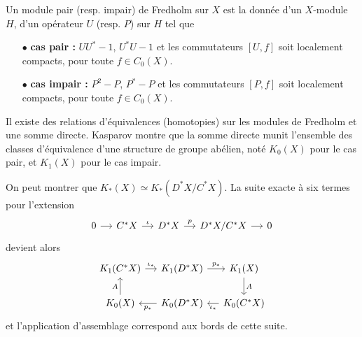 \documentclass{beamer}
\begin{document}
\begin{frame}
\begin{definition}
Un module pair (resp. impair) de Fredholm sur $X$ est la donnée d'un $X$-module $H$, d'un opérateur $U$ (resp. $P$) sur $H$ tel que
\begin{itemize}
\item[$\bullet$] \textbf{cas pair :} $UU^*-1$, $U^*U-1$ et les commutateurs $[U,f]$ soit localement compacts, pour toute $f\in C_0(X)$.
\item[$\bullet$] \textbf{cas impair :} $P^2-P$, $P^*-P$ et les commutateurs $[P,f]$ soit localement compacts, pour toute $f\in C_0(X)$.
\end{itemize}
Il existe des relations d'équivalences (homotopies) sur les modules de Fredholm et une somme directe. Kasparov montre que la somme directe munit l'ensemble des classes d'équivalence d'une structure de groupe abélien, noté $K_0(X)$ pour le cas pair, et $K_1(X)$ pour le cas impair. 
\end{definition}
\end{frame}

\begin{frame}
On peut montrer que $K_*(X)\simeq K_*(D^*X/C^*X)$. La suite exacte à six termes pour l'extension 
\[\begin{tikzcd}[ampersand replacement=\&,column sep = small]
0 \arrow{r} \& C^*X \arrow{r}{\iota} \& D^*X\arrow{r}{p} \& D^*X/C^*X\arrow{r} \& 0  
\end{tikzcd}\]
devient alors
\[\begin{tikzcd}[ampersand replacement=\&,column sep = small]
 K_1(C^*X)\arrow{r}{\iota_*}\& K_1(D^*X)\arrow{r}{p_*}\& K_1(X)\arrow{d}{A}\\
K_0(X)\arrow{u}{A}\& K_0(D^*X)\arrow{l}{p_*}\& K_0(C^*X)\arrow{l}{\iota_*}
\end{tikzcd}\]
et l'application d'assemblage correspond aux bords de cette suite.
\end{frame}
\end{document}
